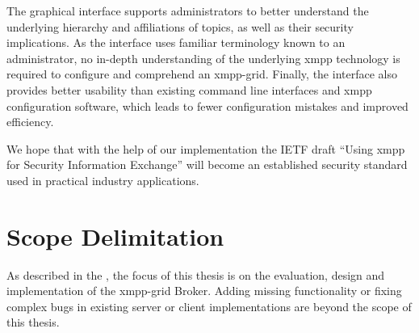 The graphical interface supports administrators to better understand the underlying hierarchy and affiliations of \glspl{topic}, as well as their security implications.
As the interface uses familiar terminology known to an administrator, no in-depth understanding of the underlying \gls{xmpp} technology is required to configure and comprehend an \gls{xmpp-grid}.
Finally, the interface also provides better usability than existing command line interfaces and \gls{xmpp} configuration software, which leads to fewer configuration mistakes and improved efficiency.

We hope that with the help of our implementation the IETF draft ``Using \gls{xmpp} for Security Information Exchange'' will become an established security standard used in practical industry applications.

\section{Scope Delimitation} %
As described in the , the focus of this thesis is on the evaluation, design and implementation of the \gls{xmpp-grid} Broker.
Adding missing functionality or fixing complex bugs in existing server or client implementations are beyond the scope of this thesis.
